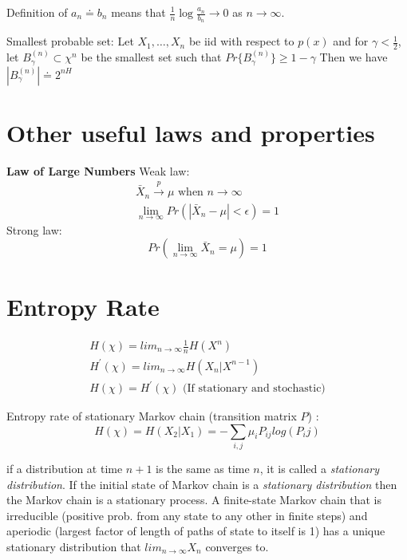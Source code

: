 \documentclass[10pt]{article}
\begin{document}
\begin{tiny}
\begin{multicols}{3}
Definition of $a_n \doteq b_n$ means that $\frac{1}{n}\log \frac{a_n}{b_n} \rightarrow 0$ as $n\rightarrow \infty$.

Smallest probable set: Let $X_1,\ldots, X_n$ be iid with respect to $p(x)$ and for $\gamma < \frac{1}{2}$, let $B_\gamma^{(n)} \subset \chi^n$ be the smallest set such that $Pr\{ B_\gamma^{(n)} \} \geq 1-\gamma $ Then we have $|B_\gamma^{(n)}| \doteq 2^{nH}$

\section*{Other useful laws and properties}
{\bf Law of Large Numbers} Weak law:
\begin{eqnarray*}
\bar{X}_n\overset{p}\rightarrow \mu \text{ when } n \rightarrow \infty\\
\lim_{n\rightarrow \infty} Pr\left(|\bar{X}_n-\mu| < \epsilon \right) = 1
\end{eqnarray*}
Strong law:
\begin{equation}
Pr\left(\lim_{n\rightarrow \infty} \bar{X}_n = \mu \right) = 1
\end{equation}

\section*{Entropy Rate}
\begin{eqnarray}
H(\chi) = lim_{n \to \infty} \frac{1}{n} H(X^n) \\
H^\prime(\chi) = lim_{n \to \infty} H(X_n | X^{n-1}) \\
H(\chi) = H^\prime(\chi) \text{ (If stationary and stochastic)}
\end{eqnarray}

\noindent Entropy rate of stationary Markov chain (transition matrix $P$) :
\begin{equation}
H(\chi) = H(X_2|X_1) = -\sum_{i,j} \mu_i P_{ij}log(P_ij)
\end{equation}

 if a distribution at time $n+1$ is the same as time $n$, it is called a {\it stationary distribution}. If the initial state of Markov chain is a {\it stationary distribution} then the Markov chain is a stationary process. A finite-state Markov chain that is irreducible (positive prob. from any state to any other in finite steps) and aperiodic (largest factor of length of paths of state to itself is 1) has a unique stationary distribution that $lim_{n \to \infty}X_n$ converges to.


\end{multicols}
\end{tiny}
\end{document}
